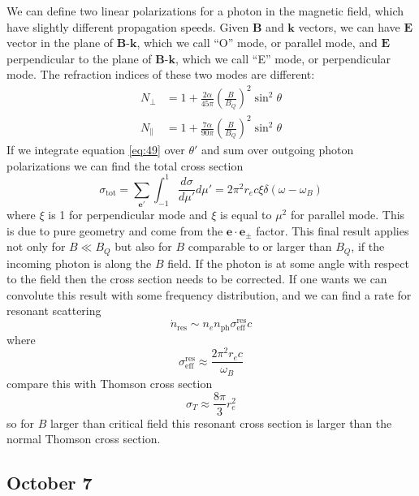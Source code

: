 \documentclass[letterpaper, 11pt]{article}
\numberwithin{equation}{section}
\numberwithin{figure}{section}
\begin{document}
We can define two linear polarizations for a photon in the magnetic field, which have slightly different propagation speeds. Given $\boldsymbol{B}$ and $\boldsymbol{k}$ vectors, we can have $\boldsymbol{E}$ vector in the plane of $\boldsymbol{B}$-$\boldsymbol{k}$, which we call ``O'' mode, or parallel mode, and $\boldsymbol{E}$ perpendicular to the plane of $\boldsymbol{B}$-$\boldsymbol{k}$, which we call ``E'' mode, or perpendicular mode. The refraction indices of these two modes are different:
\begin{align}
    \label{eq:50}
  N_{\perp} &= 1 + \frac{2\alpha}{45\pi} \left( \frac{B}{B_Q} \right)^2\sin^2\theta \\
  N_{\parallel} &= 1 + \frac{7\alpha}{90\pi} \left( \frac{B}{B_Q} \right)^2\sin^2\theta
\end{align}
If we integrate equation \eqref{eq:49} over $\theta'$ and sum over outgoing photon polarizations we can find the total cross section
\begin{equation}
    \label{eq:51}
    \sigma_\mathrm{tot} = \sum_{\boldsymbol{e}'}\int_{-1}^1\frac{d\sigma}{d\mu'}d\mu' = 2\pi^2 r_e c\xi \delta(\omega - \omega_B)
\end{equation}
where $\xi$ is 1 for perpendicular mode and $\xi$ is equal to $\mu^2$ for parallel mode. This is due to pure geometry and come from the $\boldsymbol{e}\cdot \boldsymbol{e}_{\pm}$ factor. This final result applies not only for $B\ll B_Q$ but also for $B$ comparable to or larger than $B_Q$, if the incoming photon is along the $B$ field. If the photon is at some angle with respect to the field then the cross section needs to be corrected. If one wants we can convolute this result with some frequency distribution, and we can find a rate for resonant scattering
\begin{equation}
    \label{eq:52}
    \dot{n}_\mathrm{res} \sim n_e n_\mathrm{ph}\sigma^\mathrm{res}_\mathrm{eff}c
\end{equation}
where
\begin{equation}
    \label{eq:53}
    \sigma^\mathrm{res}_\mathrm{eff} \approx \frac{2\pi^2r_ec}{\omega_B}
\end{equation}
compare this with Thomson cross section
\begin{equation}
    \label{eq:54}
    \sigma_T \approx \frac{8\pi}{3}r_e^{2}
\end{equation}
so for $B$ larger than critical field this resonant cross section is larger than the normal Thomson cross section.

\subsection{October 7}
\label{sec:oct-7}
\end{document}
